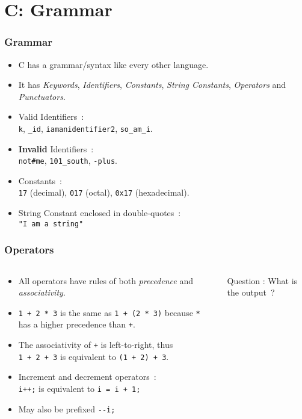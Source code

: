 \section{C: Grammar}

\begin{frame}[fragile]
\frametitle{Grammar}
\begin{itemize}[<+->]
\item  C has a grammar/syntax like every other language.
\item  It has {\it Keywords}, {\it Identifiers}, {\it Constants}, {\it String Constants}, {\it Operators} and {\it Punctuators}.
\item
Valid Identifiers~:\\
\verb+k+,
\verb+_id+,
\verb+iamanidentifier2+,
\verb+so_am_i+.
\item  {\bf Invalid} Identifiers~:\\
\verb+not#me+,
\verb+101_south+,
\verb+-plus+.
\item  Constants~:\\
\verb+17+ (decimal),
\verb+017+ (octal),
\verb+0x17+ (hexadecimal).
\item  String Constant enclosed in double-quotes~:\\
\verb+"I am a string"+
\end{itemize}
\end{frame}

\begin{frame}[fragile]
\frametitle{Operators}

\begin{columns}
\begin{column}{0.5\textwidth}
\begin{itemize}[<+->]
\item All operators have rules of both {\it precedence}
and {\it associativity}.
\item  \verb$1 + 2 * 3$ is the same as
\verb$1 + (2 * 3)$ because \verb$*$ has
a higher precedence than \verb$+$.
\item  The associativity of \verb$+$ is left-to-right, thus\\
\verb$1 + 2 + 3$ is equivalent to
\verb$(1 + 2) + 3$.
\item  Increment and decrement operators~:\\
\verb$i++;$ is equivalent to \verb$i = i + 1;$
\item  May also be prefixed \verb$--i;$
\end{itemize}
\end{column}

\begin{column}{0.5\textwidth}

{Question : What is the output~?}
\end{column}

\end{columns}
\end{frame}

